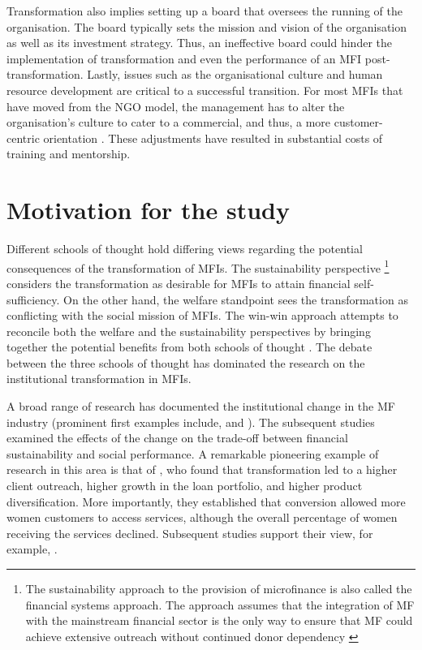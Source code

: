 \documentclass[a4paper, nobind]{templates/ociamthesis}
\begin{document}
Transformation also implies setting up a board that oversees the running of the organisation. The board typically sets the mission and vision of the organisation as well as its investment strategy. Thus, an ineffective board could hinder the implementation of transformation \autocite{campion1999institutional} and even the performance of an MFI post-transformation. Lastly, issues such as the organisational culture and human resource development are critical to a successful transition. For most MFIs that have moved from the NGO model, the management has to alter the organisation's culture to cater to a commercial, and thus, a more customer-centric orientation \autocite{christen2001commercialization}. These adjustments have resulted in substantial costs of training and mentorship.

\hypertarget{motivation-for-the-study}{%
\section{Motivation for the study}\label{motivation-for-the-study}}

\noindent Different schools of thought hold differing views regarding the potential consequences of the transformation of MFIs. The sustainability perspective \footnote{The sustainability approach to the provision of microfinance is also called the financial systems approach. The approach assumes that the integration of MF with the mainstream financial sector is the only way to ensure that MF could achieve extensive outreach without continued donor dependency \autocite{rhyne1999microfinance}} considers the transformation as desirable for MFIs to attain financial self-sufficiency. On the other hand, the welfare standpoint sees the transformation as conflicting with the social mission of MFIs. The win-win approach attempts to reconcile both the welfare and the sustainability perspectives by bringing together the potential benefits from both schools of thought \autocite{kodongo2013individual}. The debate between the three schools of thought has dominated the research on the institutional transformation in MFIs.

A broad range of research has documented the institutional change in the MF industry (prominent first examples include,\textcite{ledgerwood1998microfinance} and \textcite{ledgerwood2006transforming}). The subsequent studies examined the effects of the change on the trade-off between financial sustainability and social performance. A remarkable pioneering example of research in this area is that of \textcite{frank2008stemming}, who found that transformation led to a higher client outreach, higher growth in the loan portfolio, and higher product diversification. More importantly, they established that conversion allowed more women customers to access services, although the overall percentage of women receiving the services declined. Subsequent studies support their view, for example, \autocites[ ]{hartarska2012governance,bos2015practice}{d2017ngos}.
\end{document}
